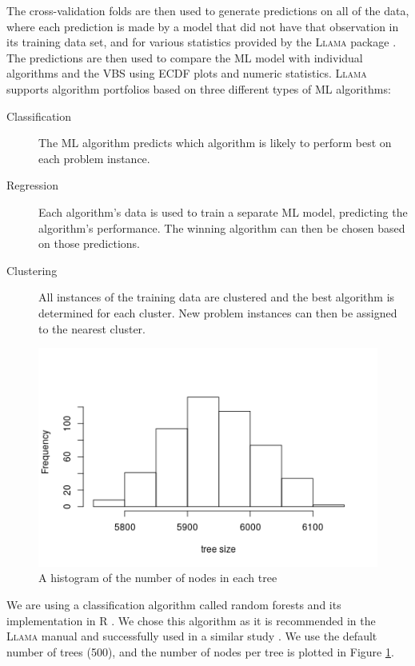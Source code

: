 \documentclass{l4proj}
\theoremstyle{definition}
\theoremstyle{remark}
\begin{document}
The cross-validation folds are then used to generate predictions on all of the
data, where each prediction is made by a model that did not have that observation
in its training data set, and for various statistics provided by the
\textsc{Llama} package \cite{llama}. The predictions are then used to compare
the ML model with individual algorithms and the VBS using ECDF plots and numeric
statistics. \textsc{Llama} \cite{kotthoff_llama_2013, llama} supports algorithm
portfolios based on three different types of ML algorithms:

\begin{description}
  \item[Classification] The ML algorithm predicts which algorithm is likely to
    perform best on each problem instance.
  \item[Regression] Each algorithm's data is used to train a separate ML model,
    predicting the algorithm's performance. The winning algorithm can then be
    chosen based on those predictions.
  \item[Clustering] All instances of the training data are clustered and the
    best algorithm is determined for each cluster. New problem instances can
    then be assigned to the nearest cluster.
\end{description}

\begin{figure} %
  \centering
  \includegraphics[scale=0.7]{images/tree_sizes.png}
  \caption{A histogram of the number of nodes in each tree}
  \label{fig:tree_size}
\end{figure}

We are using a classification algorithm called random forests
\cite{DBLP:journals/ml/Breiman01} and its implementation in R
\cite{randomforest}. We chose this algorithm as it is recommended in the
\textsc{Llama} manual \cite{kotthoff_llama_2013} and successfully used in a
similar study \cite{DBLP:conf/lion/KotthoffMS16}. We use the default number of
trees (500), and the number of nodes per tree is plotted in Figure
\ref{fig:tree_size}.
\end{document}
